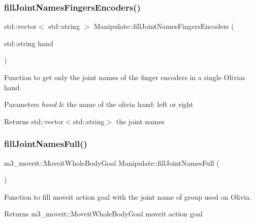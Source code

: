 \subsubsection{\texorpdfstring{fill\+Joint\+Names\+Fingers\+Encoders()}{fillJointNamesFingersEncoders()}}
{\footnotesize\ttfamily std\+::vector$<$ std\+::string $>$ Manipulate\+::fill\+Joint\+Names\+Fingers\+Encoders (\begin{DoxyParamCaption}\item[{std\+::string}]{hand }\end{DoxyParamCaption})\hspace{0.3cm}{\ttfamily [private]}}



Function to get only the joint names of the finger encoders in a single Olivia\textquotesingle{}s hand. 


\begin{DoxyParams}{Parameters}
{\em hand} & the name of the olivia hand\+: left or right \\
\hline
\end{DoxyParams}
\begin{DoxyReturn}{Returns}
std\+::vector$<$std\+::string$>$ the joint names 
\end{DoxyReturn}
\mbox{\label{structManipulate_aaf8eadf2c5afb08213485c6bd9327fac}} 
\subsubsection{\texorpdfstring{fill\+Joint\+Names\+Full()}{fillJointNamesFull()}}
{\footnotesize\ttfamily m3\+\_\+moveit\+::\+Moveit\+Whole\+Body\+Goal Manipulate\+::fill\+Joint\+Names\+Full (\begin{DoxyParamCaption}{ }\end{DoxyParamCaption})\hspace{0.3cm}{\ttfamily [private]}}



Function to fill moveit action goal with the joint name of group used on Olivia. 

\begin{DoxyReturn}{Returns}
m3\+\_\+moveit\+::\+Moveit\+Whole\+Body\+Goal moveit action goal 
\end{DoxyReturn}
\mbox{\label{structManipulate_a561688c2810b273b969b9bc8594bcac3}} 
